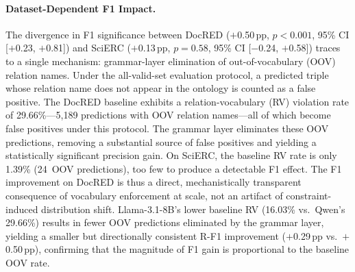\paragraph{Dataset-Dependent F1 Impact.}
The divergence in F1 significance between DocRED ($+$0.50\,pp, $p < 0.001$, 95\% CI [$+$0.23, $+$0.81]) and SciERC ($+$0.13\,pp, $p = 0.58$, 95\% CI [$-$0.24, $+$0.58]) traces to a single mechanism: grammar-layer elimination of out-of-vocabulary (OOV) relation names.
Under the all-valid-set evaluation protocol, a predicted triple whose relation name does not appear in the ontology is counted as a false positive.
The DocRED baseline exhibits a relation-vocabulary (RV) violation rate of 29.66\%---5{,}189 predictions with OOV relation names---all of which become false positives under this protocol.
The grammar layer eliminates these OOV predictions, removing a substantial source of false positives and yielding a statistically significant precision gain.
On SciERC, the baseline RV rate is only 1.39\% (24~OOV predictions), too few to produce a detectable F1 effect.
The F1 improvement on DocRED is thus a direct, mechanistically transparent consequence of vocabulary enforcement at scale, not an artifact of constraint-induced distribution shift.
Llama-3.1-8B's lower baseline RV (16.03\% vs.\ Qwen's 29.66\%)
results in fewer OOV predictions eliminated by the grammar layer,
yielding a smaller but directionally consistent R-F1 improvement
($+$0.29\,pp vs.\ $+$0.50\,pp), confirming that the magnitude of
F1 gain is proportional to the baseline OOV rate.


